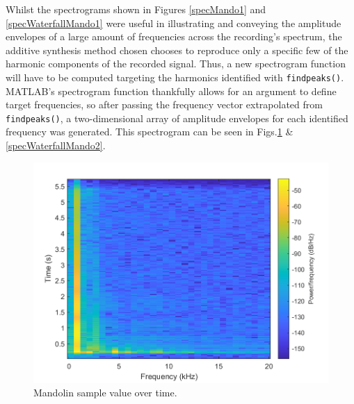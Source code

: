 \documentclass{article}
\begin{document}
            Whilst the spectrograms shown in Figures \ref{specMando1} and \ref{specWaterfallMando1} were useful in illustrating and conveying the amplitude envelopes of a large amount of frequencies across the recording's spectrum, the additive synthesis method chosen chooses to reproduce only a specific few of the harmonic components of the recorded signal.
            Thus, a new spectrogram function will have to be computed targeting the harmonics identified with \texttt{findpeaks()}.
            MATLAB's spectrogram function thankfully allows for an argument to define target frequencies, so after passing the frequency vector extrapolated from \texttt{findpeaks()}, a two-dimensional array of amplitude envelopes for each identified frequency was generated.
            This spectrogram can be seen in Figs.\ref{specMando2} \& \ref{specWaterfallMando2}.
            \begin{figure}[h]
                \includegraphics[scale=0.5]{images/specMando2.png}%
                \centering
                \caption{Mandolin sample value over time.}
                \label{specMando2}
            \end{figure}
\end{document}

